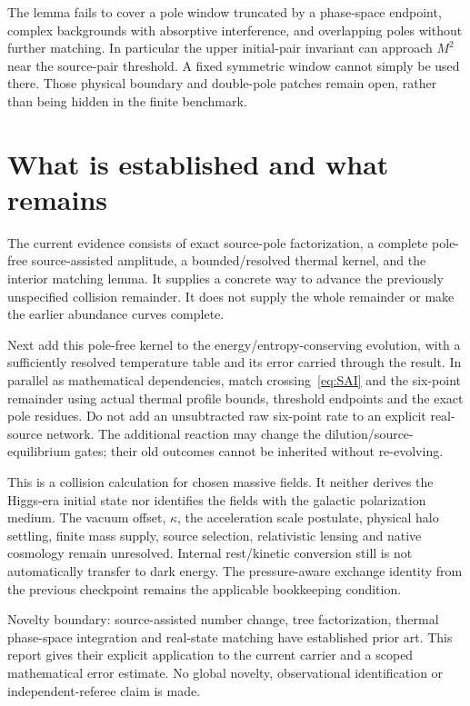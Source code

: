 \documentclass[11pt]{article}
\begin{document}
The lemma fails to cover a pole window truncated by a phase-space endpoint,
complex backgrounds with absorptive interference, and overlapping poles
without further matching. In particular the upper initial-pair invariant
can approach $M^2$ near the source-pair threshold. A fixed symmetric window
cannot simply be used there. Those physical boundary and double-pole
patches remain open, rather than being hidden in the finite benchmark.

\section{What is established and what remains}
The current evidence consists of exact source-pole factorization,
a complete pole-free source-assisted amplitude, a bounded/resolved thermal
kernel, and the interior matching lemma. It supplies a concrete way to
advance the previously unspecified collision remainder. It does not supply
the whole remainder or make the earlier abundance curves complete.

Next add this pole-free kernel to the energy/entropy-conserving evolution,
with a sufficiently resolved temperature table and its error carried
through the result. In parallel as mathematical dependencies, match
crossing~\eqref{eq:SAI} and the six-point remainder using actual thermal
profile bounds, threshold endpoints and the exact pole residues. Do not
add an unsubtracted raw six-point rate to an explicit real-source network.
The additional reaction may change the dilution/source-equilibrium gates;
their old outcomes cannot be inherited without re-evolving.

This is a collision calculation for chosen massive fields. It neither
derives the Higgs-era initial state nor identifies the fields with the
galactic polarization medium. The vacuum offset, $\kappa$, the acceleration
scale postulate, physical halo settling, finite mass supply, source
selection, relativistic lensing and native cosmology remain unresolved.
Internal rest/kinetic conversion still is not automatically transfer to
dark energy. The pressure-aware exchange identity from the previous
checkpoint remains the applicable bookkeeping condition.

Novelty boundary: source-assisted number change, tree factorization,
thermal phase-space integration and real-state matching have established
prior art. This report gives their explicit application to the current
carrier and a scoped mathematical error estimate. No global novelty,
observational identification or independent-referee claim is made.
\end{document}
